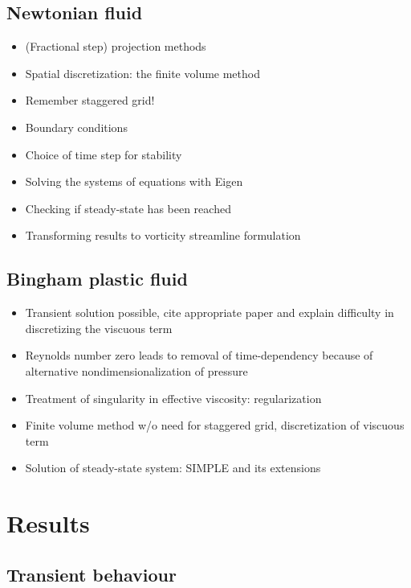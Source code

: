 \documentclass[final,3p,twocolumn]{elsarticle}
\begin{document}
\subsection{Newtonian fluid}
\label{subsec:newtonian}

\begin{itemize}
    \item (Fractional step) projection methods 
    \item Spatial discretization: the finite volume method
    \item Remember staggered grid!
    \item Boundary conditions
    \item Choice of time step for stability
    \item Solving the systems of equations with Eigen
    \item Checking if steady-state has been reached
    \item Transforming results to vorticity streamline formulation
\end{itemize}

\subsection{Bingham plastic fluid}
\label{subsec:bingham}

\begin{itemize}
    \item Transient solution possible, cite appropriate paper and explain
        difficulty in discretizing the viscuous term
    \item Reynolds number zero leads to removal of time-dependency because of
        alternative nondimensionalization of pressure 
    \item Treatment of singularity in effective viscosity: regularization
    \item Finite volume method w/o need for staggered grid, discretization of
        viscuous term
    \item Solution of steady-state system: SIMPLE and its extensions
\end{itemize}

\section{Results}
\label{sec:results}

\subsection{Transient behaviour}
\label{subsec:transient}
\end{document}
